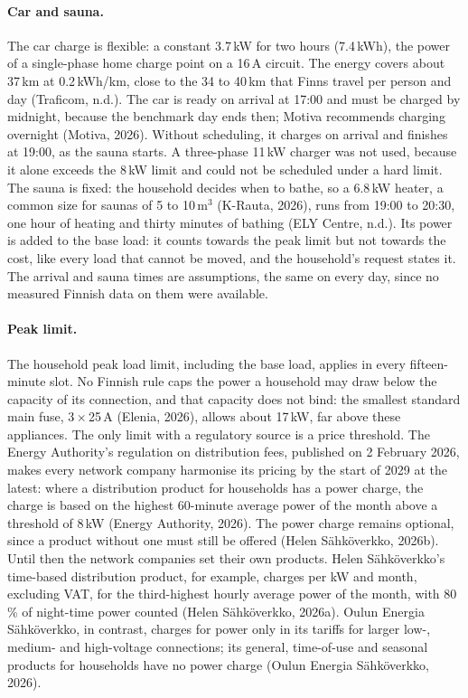 \documentclass[12pt,a4paper]{report}
\begin{document}
\paragraph{Car and sauna.} The car charge is flexible: a constant
3.7\,kW for two hours (7.4\,kWh), the power of a single-phase home
charge point on a 16\,A circuit. The energy covers about 37\,km at
0.2\,kWh/km, close to the 34 to 40\,km that Finns travel per person and
day (Traficom, n.d.). The car is ready on arrival at 17:00 and must be
charged by midnight, because the benchmark day ends then; Motiva
recommends charging overnight (Motiva, 2026). Without scheduling, it
charges on arrival and finishes at 19:00, as the sauna starts. A
three-phase 11\,kW charger was not used, because it alone exceeds the
8\,kW limit and could not be scheduled under a hard limit. The sauna is
fixed: the household decides when to bathe, so a 6.8\,kW heater, a
common size for saunas of 5 to 10\,m$^3$ (K-Rauta, 2026), runs from
19:00 to 20:30, one hour of heating and thirty minutes of bathing
(ELY Centre, n.d.). Its power is added to the base load: it counts
towards the peak limit but not towards the cost, like every load that
cannot be moved, and the household's request states it. The arrival and
sauna times are assumptions, the same on every day, since no measured
Finnish data on them were available.

\paragraph{Peak limit.} The household peak load limit, including the
base load, applies in every fifteen-minute slot. No Finnish rule caps
the power a household may draw below the capacity of its connection,
and that capacity does not bind: the smallest standard main fuse,
3\,$\times$\,25\,A (Elenia, 2026), allows about 17\,kW, far above these
appliances. The only limit with a regulatory source is a price
threshold. The Energy Authority's regulation on distribution fees,
published on 2 February 2026, makes every network company harmonise its
pricing by the start of 2029 at the latest: where a distribution
product for households has a power charge, the charge is based on the
highest 60-minute average power of the month above a threshold of
8\,kW (Energy Authority, 2026). The power charge remains optional, since
a product without one must still be offered (Helen Sähköverkko, 2026b).
Until then the network companies set their own products. Helen
Sähköverkko's time-based distribution product, for example, charges
 per kW and month, excluding VAT, for the third-highest hourly
average power of the month, with 80\,\% of night-time power counted
(Helen Sähköverkko, 2026a). Oulun Energia Sähköverkko, in contrast,
charges for power only in its tariffs for larger low-, medium- and
high-voltage connections; its general, time-of-use and seasonal products
for households have no power charge (Oulun Energia Sähköverkko, 2026).
\end{document}
